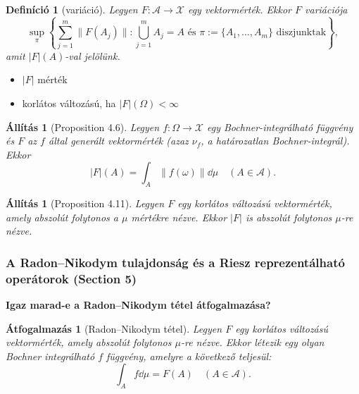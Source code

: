 \documentclass{beamer} %
\newtheorem{defi}[lem]{Definíció}
\newtheorem{allitas}[lem]{Állítás}
\newtheorem{atfog}[lem]{Átfogalmazás}
\begin{document}
\begin{frame}
\justifying
\begin{defi}[variáció]
Legyen $F\colon \mathcal{A} \to \mathcal{X}$ egy vektormérték. Ekkor $F$ variációja
$$\sup_{\pi} \left\lbrace \sum^{m}_{j=1} \| F(A_j) \| : \bigcup^{m}_{j=1} A_j = A \text{ és } \pi := \lbrace A_1, \ldots, A_m \rbrace \text{ diszjunktak} \right\rbrace,$$
amit $|F|(A)$-val jelölünk.
\end{defi}
\begin{itemize}
\pause \item $|F|$ mérték
\pause \item korlátos változású, ha $|F|(\Omega) < \infty$
\end{itemize}
\pause \begin{allitas}[Proposition 4.6] Legyen $f \colon \Omega \to \mathcal{X}$ egy Bochner-integrálható függvény és $F$ az $f$ által generált vektormérték (azaz $\nu_f$, a határozatlan Bochner-integrál). Ekkor 
$$|F|(A) = \int_{A} \| f(\omega) \| \dd{\mu} \quad (A \in \mathcal{A}).$$
\end{allitas}
\end{frame}

\begin{frame}
\justifying
\begin{allitas}[Proposition 4.11] Legyen $F$ egy korlátos változású vektormérték, amely abszolút folytonos a $\mu$ mértékre nézve. Ekkor $|F|$ is abszolút folytonos $\mu$-re nézve.
\end{allitas}
\end{frame}

\begin{frame}
\frametitle{A Radon\---Nikodym tulajdonság és a Riesz reprezentálható operátorok (Section 5)}
\justifying
\textbf{Igaz marad-e a Radon\---Nikodym tétel átfogalmazása?}
\pause \begin{atfog}[Radon\---Nikodym tétel] Legyen $F$ egy korlátos változású vektormérték, amely abszolút folytonos $\mu$-re nézve. Ekkor létezik egy olyan Bochner integrálható $f$ függvény, amelyre a következő teljesül:
$$\int_{A} f \dd{\mu} = F(A) \quad (A \in \mathcal{A}).$$
\end{atfog}
\end{frame}
\end{document}

